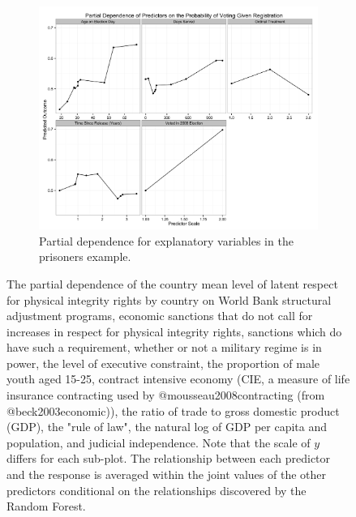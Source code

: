 \begin{figure}
        \begin{subfigure}[b]{0.5\textwidth}
                \includegraphics[width=\textwidth]{figures/pd_cond_vote.png}
                \caption{Partial dependence for explanatory variables in the prisoners example.}
                \label{fig:pd_cond_vote}
        \end{subfigure}
        \caption{The partial dependence of the country mean level of latent respect for physical integrity rights by country on World Bank structural adjustment programs, economic sanctions that do not call for increases in respect for physical integrity rights, sanctions which do have such a requirement, whether or not a military regime is in power, the level of executive constraint, the proportion of male youth aged 15-25, contract intensive economy (CIE, a measure of life insurance contracting used by @mousseau2008contracting (from @beck2003economic)), the ratio of trade to gross domestic product (GDP), the "rule of law", the natural log of GDP per capita and population, and judicial independence. Note that the scale of $y$ differs for each sub-plot. The relationship between each predictor and the response is averaged within the joint values of the other predictors conditional on the relationships discovered by the Random Forest.}
        \label{fig:pd}
\end{figure}
